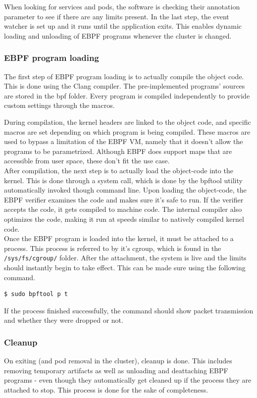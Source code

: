 When looking for services and pods, the software is checking their annotation parameter to see if there are any limits present. In the last step, the event watcher is set up and it runs until the application exits. This enables dynamic loading and unloading of EBPF programs whenever the cluster is changed.

\subsubsection{EBPF program loading}
The first step of EBPF program loading is to actually compile the object code. This is done using the Clang compiler. The pre-implemented programs' sources are stored in the bpf folder. Every program is compiled independently to provide custom settings through the macros.

During compilation, the kernel headers are linked to the object code, and specific macros are set depending on which program is being compiled. These macros are used to bypass a limitation of the EBPF VM, namely that it doesn't allow the programs to be parametrized. Although EBPF does support maps that are accessible from user space, these don't fit the use case. \\

After compilation, the next step is to actually load the object-code into the kernel. This is done through a system call, which is done by the bpftool utility automatically invoked though command line. Upon loading the object-code, the EBPF verifier examines the code and makes sure it's safe to run. If the verifier accepts the code, it gets compiled to machine code. The internal compiler also optimizes the code, making it run at speeds similar to natively compiled kernel code. \\

Once the EBPF program is loaded into the kernel, it must be attached to a process. This process is referred to by it's cgroup, which is found in the \texttt{/sys/fs/cgroup/} folder. After the attachment, the system is live and the limits should instantly begin to take effect. This can be made sure using the following command.
\begin{verbatim}
$ sudo bpftool p t
\end{verbatim}

If the process finished successfully, the command should show packet transmission and whether they were dropped or not.

\subsubsection{Cleanup}
On exiting (and pod removal in the cluster), cleanup is done. This includes removing temporary artifacts as well as unloading and deattaching EBPF programs - even though they automatically get cleaned up if the process they are attached to stop. This process is done for the sake of completeness.

